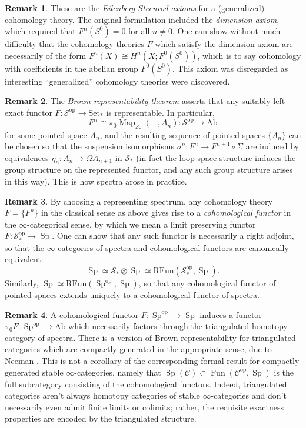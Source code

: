 \documentclass[12pt]{article}
\theoremstyle{definition}
\newtheorem{remark}{Remark}[subsection]
\newcommand{\C}{\mathcal{C}}
\renewcommand{\S}{\mathcal{S}}
\renewcommand{\i}{\infty}
\newcommand{\too}{\longrightarrow}
\newcommand{\op}{\mathrm{op}}
\DeclareMathOperator{\Fun}{Fun}
\newcommand{\Funr}{\mathrm{RFun}}
\DeclareMathOperator{\Map}{Map}
\DeclareMathOperator{\Sp}{Sp}
\newcommand{\Ab}{\mathrm{Ab}}
\begin{document}
\begin{remark}
These are the {\em Eilenberg-Steenrod axioms} \cite{ES52} for a (generalized) cohomology theory.
The original formulation included the {\em dimension axiom},
which required that $F^n(S^0)=0$ for all $n\neq 0$.
One can show without much difficulty that the cohomology theories $F$ which satisfy the dimension axiom are necessarily of the form $F^n(X)\cong H^n(X;F^0(S^0))$, which is to say cohomology with coefficients in the abelian group $F^0(S^0)$.
This axiom was disregarded as interesting ``generalized'' cohomology theories were discovered.
\end{remark}

\begin{remark}
The {\em Brown representability theorem}
\cite{Br62}
asserts that any suitably left exact functor $F:\S^{\op}\to\mathrm{Set}_*$ is representable.
In particular,
\[
F^n\cong\pi_0\Map_{\S_*}(-,A_n)\colon\S^{\op}\too\Ab
\]
for some pointed space $A_n$, and the resulting sequence of pointed spaces $\{A_n\}$ can be chosen so that the suspension isomorphisms
$\sigma^n:F^n\to F^{n+1}\circ\Sigma$ are induced by equivalences $\eta_n:A_n\to\Omega A_{n+1}$ in $\S_*$ (in fact the loop space structure induces the group structure on the represented functor, and any such group structure arises in this way). This is how spectra arose in practice.
\end{remark}




\begin{remark}
By choosing a representing spectrum, any cohomology theory $F=\{F^n\}$ in the classical sense as above gives rise to a {\em cohomological functor} in the $\i$-categorical sense, by which we mean a limit preserving functor $F:\S_*^{\op}\to\Sp$.
One can show that any such functor is necessarily a right adjoint, so that the $\i$-categories of spectra and cohomological functors are canonically equivalent: 
\[
\Sp\simeq\S_*\otimes\Sp\simeq\Funr(\S_*^{\op},\Sp).
\]
Similarly, $\Sp\simeq\Funr(\Sp^{\op},\Sp)$, so that any cohomological functor of pointed spaces extends uniquely to a cohomological functor of spectra.
\end{remark}
\begin{remark}
A cohomological functor $F:\Sp^{\op}\to\Sp$ induces a functor $\pi_0 F:\Sp^{\op}\to\Ab$ which necessarily factors through the triangulated homotopy category of spectra.
There is a version of Brown representability for triangulated categories which are compactly generated in the appropriate sense, due to Neeman \cite{Nee96}.
This is not a corollary of the corresponding formal result for compactly generated stable $\i$-categories, namely that $\Sp(\C)\subset\Fun(\C^{\op},\Sp)$ is the full subcategory consisting of the cohomological functors.
Indeed, triangulated categories aren't always homotopy categories of stable $\i$-categories and don't necessarily even admit finite limits or colimits; rather, the requisite exactness properties are encoded by the triangulated structure. 
\end{remark}
\end{document}
